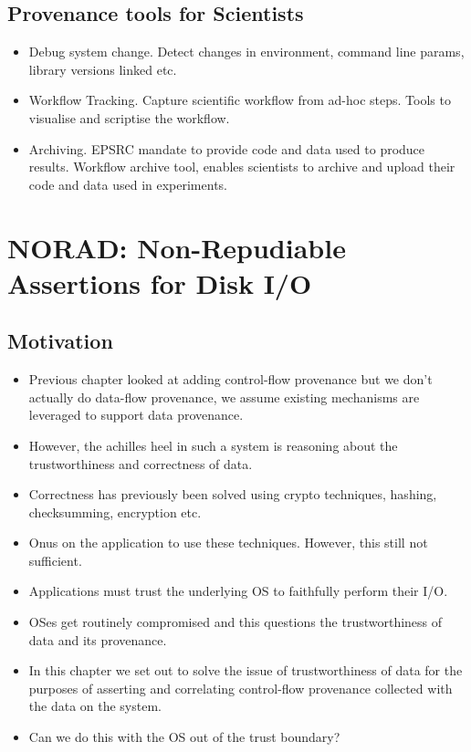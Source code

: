 \documentclass[withindex,glossary]{cam-thesis}
\begin{document}
\section{Provenance tools for Scientists}
\begin{itemize}
\item Debug system change. Detect changes in environment, command line params, library versions linked etc.
\item Workflow Tracking. Capture scientific workflow from ad-hoc steps. Tools to visualise and scriptise the workflow.
\item Archiving. EPSRC mandate to provide code and data used to produce results. Workflow archive tool, enables scientists to archive and upload their code and data used in experiments.
\end{itemize}


\chapter{NORAD: Non-Repudiable Assertions for Disk I/O}
\section{Motivation}
\begin{itemize}
\item Previous chapter looked at adding control-flow provenance but we don't actually do data-flow provenance, we assume existing mechanisms are leveraged to support data provenance.
\item However, the achilles heel in such a system is reasoning about the trustworthiness and correctness of data.
\item Correctness has previously been solved using crypto techniques, hashing, checksumming, encryption etc.
\item Onus on the application to use these techniques. However, this still not sufficient.
\item Applications must trust the underlying OS to faithfully perform their I/O.
\item OSes get routinely compromised and this questions the trustworthiness of data and its provenance.
\item In this chapter we set out to solve the issue of trustworthiness of data for the purposes of asserting and correlating control-flow provenance collected with the data on the system.
\item Can we do this with the OS out of the trust boundary?
\end{itemize}
\end{document}
